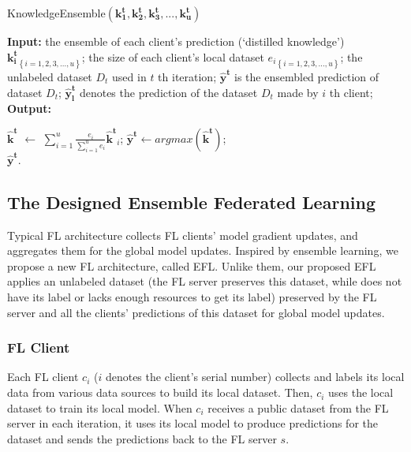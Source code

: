 \documentclass[journal]{IEEEtran}
\begin{document}
\begin{algorithm}[t]
  \caption{KnowledgeEnsemble$(\mathbf{k_1^t},\mathbf{k_2^t},\mathbf{k_3^t},...,\mathbf{k_u^t})$} %
  \label{alg:KnowledgeEnsemble}
  \hspace*{0.02in} {\bf Input:} %
  the ensemble of each client's prediction (`distilled knowledge') ${\mathbf{k_i^t}}_{\left \{ i= 1,2,3,...,u \right \}}$; the size of each client's local dataset ${e_i}_{\left \{ i= 1,2,3,...,u \right \}}$; the unlabeled dataset $D_t$ used in $t$ th iteration; $\mathbf{\hat{y}^t}$ is the ensembled prediction of dataset $D_t$; $\mathbf{\hat{y}^t_l}$ denotes the prediction of the dataset $D_t$ made by $i$ th client;\\
  \hspace*{0.02in} {\bf Output:} %
  \begin{algorithmic}[1]
      \State $\mathbf{\hat{k}^t}$ $\gets$ $\sum_{i=1}^{u}\frac{e_i}{\sum_{i=1}^{u}e_i}\mathbf{\hat{k}^t}_i$;
      \State $\mathbf{\hat{y}^t}\gets argmax(\mathbf{\hat{k}^t})$;
    \EndFor \\
    \Return $\mathbf{\hat{y}^t}$.
  \end{algorithmic}
  \end{algorithm}

\subsection{The Designed Ensemble Federated Learning}
\par Typical FL architecture collects FL clients' model gradient updates, and aggregates them for the global model updates. Inspired by ensemble learning, we propose a new FL architecture, called EFL. Unlike them, our proposed EFL applies an unlabeled dataset (the FL server preserves this dataset, while does not have its label or lacks enough resources to get its label) preserved by the FL server and all the clients' predictions of this dataset for global model updates.
\subsubsection{{FL Client}} Each FL client {$c_{i}$} ($i$ denotes the client's serial number) collects and labels its local data from various data sources to build its local dataset. Then, {$c_{i}$} uses the local dataset to train its local model. When {$c_{i}$} receives a public dataset from the FL server in each iteration, it uses its local model to produce predictions for the dataset and sends the predictions back to the FL server $s$.
\end{document}
